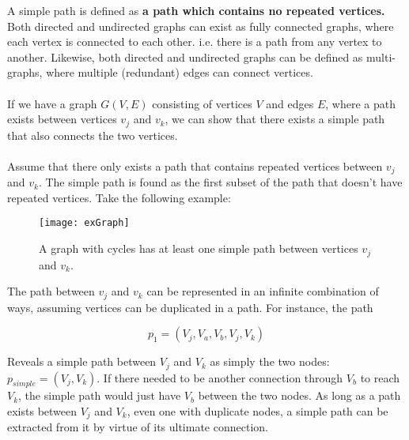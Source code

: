 \documentclass[]{../../ncmathy}
\begin{document}
A simple path is defined as \textbf{a path which contains no repeated vertices.} Both directed and undirected graphs can exist as fully connected graphs, where each vertex is connected to each other. i.e. there is a path from any vertex to another. Likewise, both directed and undirected graphs can be defined as multi-graphs, where multiple (redundant) edges can connect vertices. 
\\\\
If we have a graph $G(V,E)$ consisting of vertices $V$ and edges $E$, where a path exists between vertices $v_j$ and $v_k$, we can show that there exists a simple path that also connects the two vertices. 
\\\\
Assume that there only exists a path that contains repeated vertices between $v_j$ and $v_k$. The simple path is found as the first subset of the path that doesn't have repeated vertices. Take the following example:

\begin{figure}[H]
\centering\texttt{[image: exGraph]}
\caption{A graph with cycles has at least one simple path between vertices $v_j$ and $v_k$.}
\end{figure}

The path between $v_j$ and $v_k$ can be represented in an infinite combination of ways, assuming vertices can be duplicated in a path. For instance, the path

\begin{equation}
	p_1 = (V_j, V_a, V_b, V_j, V_k)
\end{equation}

Reveals a simple path between $V_j$ and $V_k$ as simply the two nodes: $p_{simple} = (V_j, V_k)$. If there needed to be another connection through $V_b$ to reach $V_k$, the simple path would just have $V_b$ between the two nodes. As long as a path exists between $V_j$ and $V_k$, even one with duplicate nodes, a simple path can be extracted from it by virtue of its ultimate connection.
\end{document}
